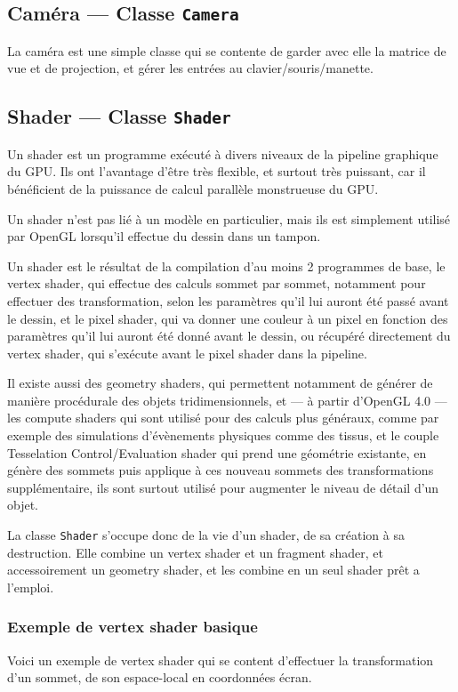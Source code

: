 \documentclass[pdftex, 11pt, a4paper, titlepage]{article}
\begin{document}
\pagebreak
\subsection{Caméra --- Classe \texttt{Camera}}

La caméra est une simple classe qui se contente de garder avec elle la
matrice de vue et de projection, et gérer les entrées au
clavier/souris/manette.

\subsection{Shader --- Classe \texttt{Shader}}

Un shader est un programme exécuté à divers niveaux de la pipeline
graphique du GPU.  Ils ont l'avantage d'être très flexible, et surtout
très puissant, car il bénéficient de la puissance de calcul parallèle
monstrueuse du GPU.

Un shader n'est pas lié à un modèle en particulier, mais ils est
simplement utilisé par OpenGL lorsqu'il effectue du dessin dans un
tampon.

Un shader est le résultat de la compilation d'au moins 2 programmes de
base, le vertex shader, qui effectue des calculs sommet par sommet,
notamment pour effectuer des transformation, selon les paramètres
qu'il lui auront été passé avant le dessin, et le pixel shader, qui va
donner une couleur à un pixel en fonction des paramètres qu'il lui
auront été donné avant le dessin, ou récupéré directement du vertex
shader, qui s'exécute avant le pixel shader dans la pipeline.

Il existe aussi des geometry shaders, qui permettent notamment de
générer de manière procédurale des objets tridimensionnels, et --- à
partir d'OpenGL 4.0 --- les compute shaders qui sont utilisé pour des
calculs plus généraux, comme par exemple des simulations d'évènements
physiques comme des tissus, et le couple Tesselation
Control/Evaluation shader qui prend une géométrie existante, en génère
des sommets puis applique à ces nouveau sommets des transformations
supplémentaire, ils sont surtout utilisé pour augmenter le niveau de
détail d'un objet.

La classe \texttt{Shader} s'occupe donc de la vie d'un shader, de sa
création à sa destruction.  Elle combine un vertex shader et un
fragment shader, et accessoirement un geometry shader, et les combine
en un seul shader prêt a l'emploi.

\subsubsection{Exemple de vertex shader basique}
Voici un exemple de vertex shader qui se content d'effectuer la
transformation d'un sommet, de son espace-local en coordonnées écran.
\end{document}

